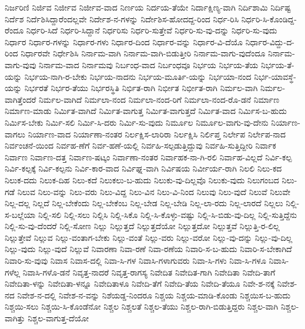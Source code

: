 ನಿರ್ಜರಿಣಿ
ನಿರ್ಜಿವ
ನಿರ್ಜೀವ
ನಿರ್ಜೀವ-ವಾದ
ನಿರ್ಣಯ
ನಿರ್ದಯ-ತೆಯೇ
ನಿರ್ದಾಕ್ಷಿಣ್ಯ-ವಾಗಿ
ನಿರ್ದಿಶಾಮಿ
ನಿರ್ದಿಷ್ಟ
ನಿರ್ದೆಶ
ನಿರ್ದೆಶಿಸಿದ್ದಾರೆಂದಲ್ಲವೇ
ನಿರ್ದೇಶ-ನ-ಗಳನ್ನು
ನಿರ್ದೇಶಿಸ-ಹೋದದ್ದ-ರಿಂದ
ನಿರ್ಧ-ರಿಸಿ
ನಿರ್ಧರಿ-ಸಿ-ಕೊಂಡಿದ್ದ-ರೆಂದೂ
ನಿರ್ಧರಿ-ಸಿದೆ
ನಿರ್ಧರಿ-ಸಿದ್ದಾನೆ
ನಿರ್ಧರಿಸು
ನಿರ್ಧರಿ-ಸುತ್ತೇವೆ
ನಿರ್ಧರಿ-ಸು-ವು-ದನ್ನು
ನಿರ್ಧರಿ-ಸು-ವುದು
ನಿರ್ಧಾರ
ನಿರ್ಧಾರ-ಗಳನ್ನು
ನಿರ್ಧಾರ-ಗಳು
ನಿರ್ಧಾರ-ದಿಂದ
ನಿರ್ಧಾರ-ವನ್ನು
ನಿರ್ಧಾರ-ವಿ-ದೆಯೊ
ನಿರ್ಧಾರ-ವಿದ್ದು-ದ-ರಿಂದ
ನಿರ್ಧಾರವೇ
ನಿರ್ಧೇಶಿಸಿ
ನಿರ್ನಾಮ-ವಾಗಿ
ನಿರ್ನಾಮ-ವಾಗಿ-ಬಿಡುತ್ತೀರಿ
ನಿರ್ನಾಮ-ವಾಗು-ವುದೆಂದೂ
ನಿರ್ನಾಮ-ವಾಗು-ವುವು
ನಿರ್ನಾಮ-ವಾದ
ನಿರ್ನಾಮವು
ನಿರ್ಬಂಧ-ವಾದ
ನಿರ್ಬಂಧವೂ
ನಿರ್ಭಯ
ನಿರ್ಭಯ-ತೆಯ
ನಿರ್ಭಯ-ತೆ-ಯನ್ನು
ನಿರ್ಭಯ-ನಾಗಿ-ರ-ಬೇಕು
ನಿರ್ಭಯ-ನಾದನು
ನಿರ್ಭಯ-ಮೂರ್ತಿ-ಯನ್ನು
ನಿರ್ಭಯಾ-ನಂದ
ನಿರ್ಭ-ಯಾವಸ್ಥೆ-ಯನ್ನು
ನಿರ್ಭರತೆ
ನಿರ್ಭರ-ತೆಯು
ನಿರ್ಭರಸ್ಥಿತಿ
ನಿರ್ಭಿತ-ರಾಗಿ
ನಿರ್ಭೀತ
ನಿರ್ಭೀತ-ರಾಗಿ
ನಿರ್ಮಲ-ವಾಗಿ
ನಿರ್ಮಲ-ವಾಗಿತ್ತೆಂದರೆ
ನಿರ್ಮಲ-ವಾಗಿದೆ
ನಿರ್ಮಲಾ-ನಂದ
ನಿರ್ಮಲಾ-ನಂದ-ರಿಗೆ
ನಿರ್ಮಲಾ-ನಂದ-ರೊ-ಡನೆ
ನಿರ್ಮಾಣ
ನಿರ್ಮಾಣ-ಮಾಡು
ನಿರ್ಮಿತ-ವಾಗಿದೆ
ನಿರ್ಮಿತ-ವಾಗುತ್ತ
ನಿರ್ಮಿತ-ವಾಗುತ್ತದೆ
ನಿರ್ಮಿತ-ವಾದ
ನಿರ್ಮಿಸ-ಬ-ಹುದು
ನಿರ್ಮಿಸ-ಬೇಕು
ನಿರ್ಮಿ-ಸಲಿ
ನಿರ್ಮಿ-ಸಿ-ದರು
ನಿರ್ಮಿ-ಸು-ವುದು
ನಿರ್ಮೂಲ
ನಿರ್ಮೂಲ-ವಾಗು-ವು-ದೇನು
ನಿರ್ಯಾಣ-ವಾಗಲು
ನಿರ್ಯಾಣ-ವಾದ
ನಿರ್ಯಾಣಾ-ನಂತರ
ನಿರ್ಲಕ್ಷಿಸ-ಲಾರಿರಾ
ನಿರ್ಲಕ್ಷಿಸಿ
ನಿರ್ಲಿಪ್ತ
ನಿರ್ಲೇಪ
ನಿರ್ಲೇಪ-ನಾದ
ನಿರ್ವಂಚನೆ-ಯಿಂದ
ನಿರ್ವಹ-ಣೆಗೆ
ನಿರ್ವ-ಹಣೆ-ಯಲ್ಲಿ
ನಿರ್ವಹಿ-ಸಲ್ಪಡುತ್ತಿದ್ದುವು
ನಿರ್ವಹಿ-ಸುತ್ತಿದ್ದೀರಿ
ನಿರ್ವಾಕ
ನಿರ್ವಾಣ
ನಿರ್ವಾಣ-ದತ್ತ
ನಿರ್ವಾಣ-ಷಟ್ಕಂ
ನಿರ್ವಾಣಾ-ನಂತರ
ನಿರ್ವಾಹಕ-ನಾ-ಗಿ-ರಲಿ
ನಿರ್ವಾಹ-ವಿಲ್ಲದೆ
ನಿರ್ವಿ-ಕಲ್ಪ
ನಿರ್ವಿ-ಕಲ್ಪಕ್ಕೆ
ನಿರ್ವಿ-ಕಲ್ಪನು
ನಿರ್ವಿ-ಕಾರ-ವಾದ
ನಿರ್ವಿಘ್ನ-ವಾಗಿ
ನಿರ್ವಿಷಯ
ನಿರ್ವೀರ್ಯ-ರಾಗಿ
ನಿಲಲಿ
ನಿಲು-ಕದ
ನಿಲುಕ-ದದು
ನಿಲುಕ-ದಿಹ
ನಿಲು-ಕದೆ
ನಿಲುಕಲು-ಬ-ಹುದು
ನಿಲುಕು-ವು-ದಿಲ್ಲವೊ
ನಿಲುಕು-ವುದು
ನಿಲುಗಂಬದ
ನಿಲು-ಗಡೆ
ನಿಲುವ
ನಿಲು-ವನ್ನು
ನಿಲು-ವರು
ನಿಲು-ವಿದ್ದ
ನಿಲು-ವಿನ
ನಿಲು-ವಿ-ನಿಂದ
ನಿಲುವು
ನಿಲು-ವುದೆ
ನಿಲುವೆ
ನಿಲುವೇ
ನಿಲ್ಲ-ದಲ್ಲ
ನಿಲ್ಲದೆ
ನಿಲ್ಲ-ಬೇಕೆಂದು
ನಿಲ್ಲ-ಬೇಕೆಂಬ
ನಿಲ್ಲ-ಬೇಡ
ನಿಲ್ಲ-ಬೇಡಿ
ನಿಲ್ಲ-ಲಾ-ರದು
ನಿಲ್ಲ-ಲಾರದೆ
ನಿಲ್ಲಲು
ನಿಲ್ಲಿ-ಸ-ಬಲ್ಲೆಯಾ
ನಿಲ್ಲಿ-ಸಲಿ
ನಿಲ್ಲಿ-ಸಲು
ನಿಲ್ಲಿಸಿ
ನಿಲ್ಲಿ-ಸಿಕೊ
ನಿಲ್ಲಿ-ಸಿ-ಕೊಳ್ಳು-ವಷ್ಟು
ನಿಲ್ಲಿ-ಸಿ-ಬಿಡು-ವು-ದಿಲ್ಲ
ನಿಲ್ಲಿ-ಸುತ್ತಿದ್ದೆನು
ನಿಲ್ಲಿ-ಸು-ವು-ದೆಂದರೆ
ನಿಲ್ಲಿ-ಸೋಣ
ನಿಲ್ಲು
ನಿಲ್ಲುತ್ತದೆ
ನಿಲ್ಲುತ್ತದೆಯೋ
ನಿಲ್ಲುತ್ತದೋ
ನಿಲ್ಲುತ್ತವೆ
ನಿಲ್ಲುತ್ತಿ-ರ-ಲಿಲ್ಲ
ನಿಲ್ಲುತ್ತೇವೆ
ನಿಲ್ಲುವ
ನಿಲ್ಲು-ವಂತಾಗ-ಬೇಕು
ನಿಲ್ಲು-ವಂತೆ
ನಿಲ್ಲು-ವರು
ನಿಲ್ಲು-ವರೋ
ನಿಲ್ಲು-ವು-ದನ್ನು
ನಿಲ್ಲು-ವು-ದಿಲ್ಲ
ನಿಲ್ಲು-ವುದು
ನಿಲ್ಲು-ವುದೆ
ನಿಲ್ಲುವೆ
ನಿವಾರಣಾ
ನಿವಾ-ರಣೆ
ನಿವಾ-ರಣೆಯ
ನಿವಾರಿ-ಸ-ಬ-ಹುದು
ನಿವಾರಿ-ಸ-ಬೇಕಾಗಿದೆ
ನಿವಾರಿ-ಸು-ವುವು
ನಿವಾಸ
ನಿವಾಸ-ದಲ್ಲಿ
ನಿವಾ-ಸಿ-ಗಳ
ನಿವಾಸಿ-ಗಳಾಗುವರು
ನಿವಾ-ಸಿ-ಗಳು
ನಿವಾ-ಸಿ-ಗಳೂ
ನಿವಾಸಿ-ಗಳೆಲ್ಲ
ನಿವಾಸಿ-ಗಳೊ-ಡನೆ
ನಿವೃತ್ತ-ನಾದರೆ
ನಿವೃತ್ತ-ರಾಗಸ್ಯ
ನಿವೇದಿತ
ನಿವೇದಿತ-ಗಾಗಿ
ನಿವೇದಿತಾ
ನಿವೇದಿ-ತಾಗೆ
ನಿವೇದಿತಾ-ಳನ್ನು
ನಿವೇದಿತಾ-ಳನ್ನೂ
ನಿವೇದಿತಾಳೂ
ನಿವೇದಿ-ತೆಗೆ
ನಿವೇದಿ-ತೆಯ
ನಿವೇದಿ-ತೆಯೂ
ನಿವೇ-ಶ-ನಕ್ಕೆ
ನಿವೇಶ-ನದ
ನಿವೇಶ-ನ-ದಲ್ಲಿ
ನಿವೇಶ-ನ-ವನ್ನು
ನಿಶೆಯಡ್ಡ-ನಿಂದರೂ
ನಿಶ್ಚಯ
ನಿಶ್ಚಯ-ಮಾಡಿ-ಕೊಂಡು
ನಿಶ್ಚಯಿಸ-ಬ-ಹುದು
ನಿಶ್ಚಯಿ-ಸಲು
ನಿಶ್ಚಯಿ-ಸಿ-ಕೊಂಡೆನೋ
ನಿಶ್ಚಲ
ನಿಶ್ಚಲತೆ
ನಿಶ್ಚಲ-ತೆಯು
ನಿಶ್ಚಲ-ರಾಗಿ-ಬಿಡುತ್ತಿದ್ದರು
ನಿಶ್ಚಲ-ವಾಗಿ
ನಿಶ್ಚಲ-ವಾಗಿತ್ತು
ನಿಶ್ಚಲ-ವಾಗುತ್ತ-ದೆಯೋ
